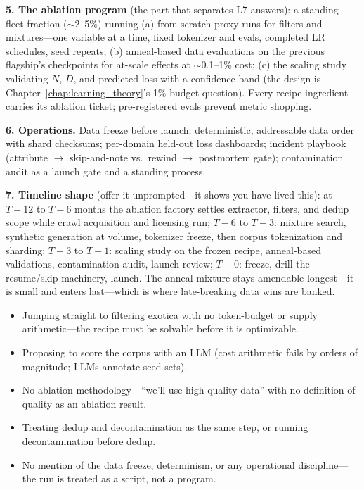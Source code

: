 \begin{interviewq}
\textbf{5. The ablation program} (the part that separates L7 answers): a standing fleet fraction ($\sim$2--5\%) running (a) from-scratch proxy runs for filters and mixtures---one variable at a time, fixed tokenizer and evals, completed LR schedules, seed repeats; (b) anneal-based data evaluations on the previous flagship's checkpoints for at-scale effects at $\sim$0.1--1\% cost; (c) the scaling study validating $N$, $D$, and predicted loss with a confidence band (the design is Chapter~\ref{chap:learning_theory}'s 1\%-budget question). Every recipe ingredient carries its ablation ticket; pre-registered evals prevent metric shopping.

\textbf{6. Operations.} Data freeze before launch; deterministic, addressable data order with shard checksums; per-domain held-out loss dashboards; incident playbook (attribute $\rightarrow$ skip-and-note vs.\ rewind $\rightarrow$ postmortem gate); contamination audit as a launch gate and a standing process.

\textbf{7. Timeline shape} (offer it unprompted---it shows you have lived this): at $T{-}12$ to $T{-}6$ months the ablation factory settles extractor, filters, and dedup scope while crawl acquisition and licensing run; $T{-}6$ to $T{-}3$: mixture search, synthetic generation at volume, tokenizer freeze, then corpus tokenization and sharding; $T{-}3$ to $T{-}1$: scaling study on the frozen recipe, anneal-based validations, contamination audit, launch review; $T{-}0$: freeze, drill the resume/skip machinery, launch. The anneal mixture stays amendable longest---it is small and enters last---which is where late-breaking data wins are banked.

\redflags
\begin{itemize}
    \item Jumping straight to filtering exotica with no token-budget or supply arithmetic---the recipe must be solvable before it is optimizable.
    \item Proposing to score the corpus with an LLM (cost arithmetic fails by orders of magnitude; LLMs annotate seed sets).
    \item No ablation methodology---``we'll use high-quality data'' with no definition of quality as an ablation result.
    \item Treating dedup and decontamination as the same step, or running decontamination before dedup.
    \item No mention of the data freeze, determinism, or any operational discipline---the run is treated as a script, not a program.
\end{itemize}


\end{interviewq}
